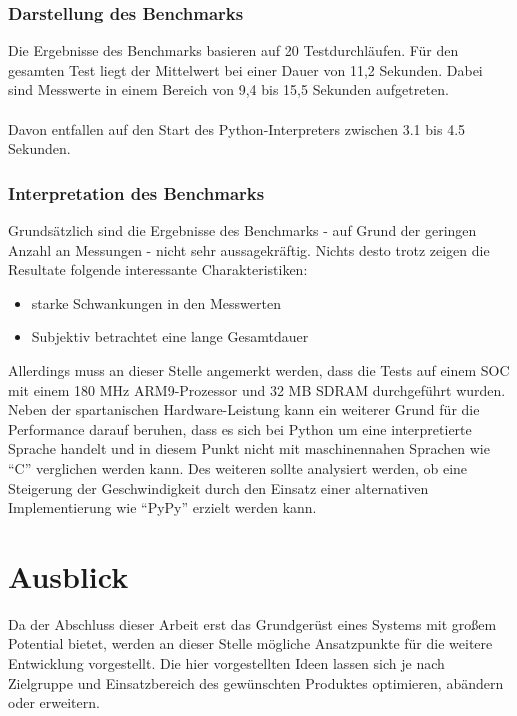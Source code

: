 \documentclass[Bachelorarbeit.tex]{subfiles}
\begin{document}
\subsubsection*{Darstellung des Benchmarks}
Die Ergebnisse des Benchmarks basieren auf 20 Testdurchläufen. 
Für den gesamten Test liegt der Mittelwert bei einer Dauer von 11,2 Sekunden. 
Dabei sind Messwerte in einem Bereich von 9,4 bis 15,5 Sekunden aufgetreten.\\
\\
Davon entfallen auf den Start des Python-Interpreters zwischen 3.1 bis 4.5 Sekunden.

\subsubsection*{Interpretation des Benchmarks}
Grundsätzlich sind die Ergebnisse des Benchmarks - auf Grund der geringen Anzahl an Messungen - nicht sehr aussagekräftig. Nichts desto trotz zeigen die Resultate folgende interessante Charakteristiken:
\begin{itemize}
\item starke Schwankungen in den Messwerten
\item Subjektiv betrachtet eine lange Gesamtdauer
\end{itemize}
Allerdings muss an dieser Stelle angemerkt werden, dass die Tests auf einem \ac{SOC} mit einem 180 MHz \ac{ARM}9-Prozessor und 32 MB \ac{SDRAM} durchgeführt wurden. 
Neben der spartanischen Hardware-Leistung kann ein weiterer Grund für die Performance darauf beruhen, dass es sich bei Python um eine interpretierte Sprache handelt und in diesem Punkt nicht mit maschinennahen Sprachen wie "`C"' verglichen werden kann. 
Des weiteren sollte analysiert werden, ob eine Steigerung der Geschwindigkeit durch den Einsatz einer alternativen Implementierung wie "`PyPy"' \parencite[vgl.][]{pypy_speedtest} erzielt werden kann.

\section{Ausblick}
\label{sec:ausblick}
Da der Abschluss dieser Arbeit erst das Grundgerüst eines Systems mit großem Potential bietet, werden an dieser Stelle mögliche Ansatzpunkte für die weitere Entwicklung vorgestellt. 
Die hier vorgestellten Ideen lassen sich je nach Zielgruppe und Einsatzbereich des gewünschten Produktes optimieren, abändern oder erweitern. 
\end{document}
